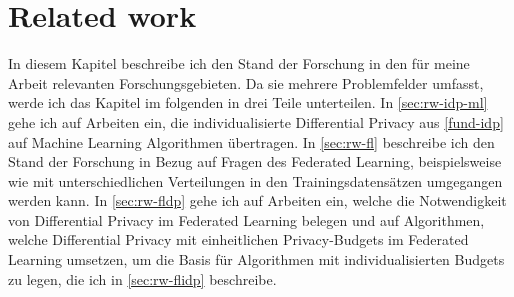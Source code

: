 \chapter{Related work}\label{chap:related-work}


In diesem Kapitel beschreibe ich den Stand der Forschung in den für meine Arbeit relevanten Forschungsgebieten. Da sie mehrere Problemfelder umfasst, werde ich das Kapitel im folgenden in drei Teile unterteilen. In \autoref{sec:rw-idp-ml} gehe ich auf Arbeiten ein, die individualisierte Differential Privacy aus \autoref{fund-idp} auf Machine Learning Algorithmen übertragen. In \autoref{sec:rw-fl} beschreibe ich den Stand der Forschung in Bezug auf Fragen des Federated Learning, beispielsweise wie mit unterschiedlichen Verteilungen in den Trainingsdatensätzen umgegangen werden kann. In \autoref{sec:rw-fldp} gehe ich auf Arbeiten ein, welche die Notwendigkeit von Differential Privacy im Federated Learning belegen und auf Algorithmen, welche Differential Privacy mit einheitlichen Privacy-Budgets im Federated Learning umsetzen, um die Basis für Algorithmen mit individualisierten Budgets zu legen, die ich in \autoref{sec:rw-flidp} beschreibe.

